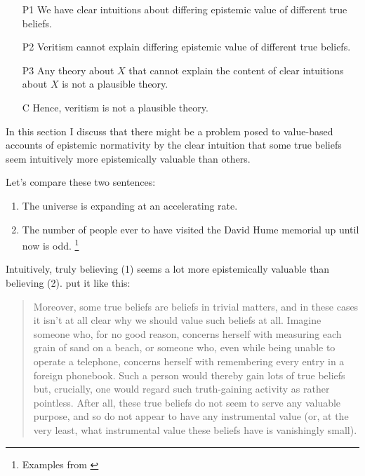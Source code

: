 \documentclass[12pt,numbers=noenddot]{scrartcl}
\begin{document}

\begin{enumerate}
    \item[P1] We have clear intuitions about differing epistemic value of different true beliefs.
    \item[P2] Veritism cannot explain differing epistemic value of different true beliefs.
    \item[P3] Any theory about $X$ that cannot explain the content of clear intuitions about $X$ is not a plausible theory.
    \item[C] Hence, veritism is not a plausible theory.
\end{enumerate}

In this section I discuss that there might be a problem posed to value-based accounts of epistemic normativity by the clear intuition that some true beliefs seem intuitively more epistemically valuable than others.

Let's compare these two sentences:
\begin{enumerate}
    \item The universe is expanding at an accelerating rate.
    \item The number of people ever to have visited the David Hume memorial up until now is odd. \footnote{Examples from \textcite{Ahlstrom-Vij2013}}
\end{enumerate}

Intuitively, truly believing (1) seems a lot more epistemically valuable than believing (2). \textcite{sep-knowledge-value} put it like this:

\begin{quote}
    Moreover, some true beliefs are beliefs in trivial matters, and in these cases it isn't at all clear why we should value such beliefs at all. Imagine someone who, for no good reason, concerns herself with measuring each grain of sand on a beach, or someone who, even while being unable to operate a telephone, concerns herself with remembering every entry in a foreign phonebook. Such a person would thereby gain lots of true beliefs but, crucially, one would regard such truth-gaining activity as rather pointless. After all, these true beliefs do not seem to serve any valuable purpose, and so do not appear to have any instrumental value (or, at the very least, what instrumental value these beliefs have is vanishingly small).
\end{quote}
\end{document}
